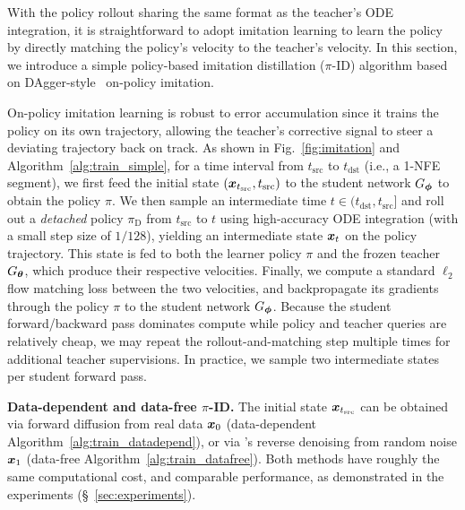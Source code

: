With the policy rollout sharing the same format as the teacher’s ODE integration, 
it is straightforward to adopt imitation learning to learn the policy by directly matching the policy's velocity to the teacher's velocity. 
In this section, we introduce a simple policy-based imitation distillation ($\pi$-ID) algorithm based on DAgger-style~\citep{dagger} on-policy imitation.

On-policy imitation learning is robust to error accumulation since it trains the policy on its own trajectory, allowing the teacher's corrective signal to steer a deviating trajectory back on track.
As shown in Fig.~\ref{fig:imitation} and Algorithm~\ref{alg:train_simple}, for a time interval from $t_{\text{src}}$ to $t_{\text{dst}}$ (i.e., a 1-NFE segment), we first feed the initial state $({\bm{x}}_{t_{\text{src}}}, t_{\text{src}})$ to the student network $G_{\bm{\phi}}$ to obtain the policy $\pi$. We then sample an intermediate time $t \in (t_\text{dst}, t_\text{src}]$  and roll out a \emph{detached} policy $\pi_{\text{D}}$ from $t_{\text{src}}$ to $t$ using high-accuracy ODE integration (with a small step size of $1/128$), yielding an intermediate state ${\bm{x}}_t$ on the policy trajectory. This state is fed to both the learner policy $\pi$ and the frozen teacher $G_{\bm{\theta}}$, which produce their respective velocities. Finally, we compute a standard $\ell_2$ flow matching loss between the two velocities, and backpropagate its gradients through the policy $\pi$ to the student network $G_{\bm{\phi}}$. Because the student forward/backward pass dominates compute while policy and teacher queries are relatively cheap, we may repeat the rollout-and-matching step multiple times for additional teacher supervisions. In practice, we sample two intermediate states per student forward pass.

\textbf{Data-dependent and data-free $\pi$-ID.} The initial state ${\bm{x}}_{t_{\text{src}}}$ can be obtained via forward diffusion from real data ${\bm{x}}_0$ (data-dependent Algorithm~\ref{alg:train_datadepend}), or via \methodname's reverse denoising from random noise ${\bm{x}}_1$ (data-free Algorithm~\ref{alg:train_datafree}). Both methods have roughly the same computational cost, and comparable performance, as demonstrated 
in the experiments (\S~\ref{sec:experiments}).  

\textbf{} 
